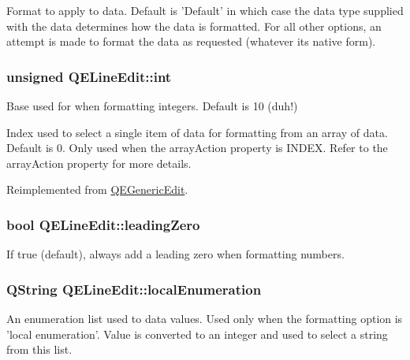 \label{classQELineEdit_a898821256a4bab25580a3007fffa44c2}
Format to apply to data. Default is 'Default' in which case the data type supplied with the data determines how the data is formatted. For all other options, an attempt is made to format the data as requested (whatever its native form). \hypertarget{classQELineEdit_adf8beec6661bba8c6a8a277c0dcd2bdd}{
\subsubsection[{int}]{\setlength{\rightskip}{0pt plus 5cm}unsigned QELineEdit::int}}
\label{classQELineEdit_adf8beec6661bba8c6a8a277c0dcd2bdd}
Base used for when formatting integers. Default is 10 (duh!)

Index used to select a single item of data for formatting from an array of data. Default is 0. Only used when the arrayAction property is INDEX. Refer to the arrayAction property for more details. 

Reimplemented from \hyperlink{classQEGenericEdit_a9e520be7f9bbbede4efc7fb4c9cebd9d}{QEGenericEdit}.

\hypertarget{classQELineEdit_acdeda3df03354f255962dfe8b5c51ba6}{
\subsubsection[{leadingZero}]{\setlength{\rightskip}{0pt plus 5cm}bool QELineEdit::leadingZero}}
\label{classQELineEdit_acdeda3df03354f255962dfe8b5c51ba6}
If true (default), always add a leading zero when formatting numbers. \hypertarget{classQELineEdit_a5177a3df7094ff270aa3fe7096875a98}{
\subsubsection[{localEnumeration}]{\setlength{\rightskip}{0pt plus 5cm}QString QELineEdit::localEnumeration}}
\label{classQELineEdit_a5177a3df7094ff270aa3fe7096875a98}
An enumeration list used to data values. Used only when the formatting option is 'local enumeration'. Value is converted to an integer and used to select a string from this list.

